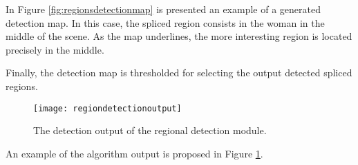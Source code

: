 In Figure \ref{fig:regionsdetectionmap} is presented an example of a generated detection map. In this case, the spliced region consists in the woman in the middle of the scene. As the map underlines, the more interesting region is located precisely in the middle.

Finally, the detection map is thresholded for selecting the output detected spliced regions.

\begin{figure}[h!]
  \centering
    \texttt{[image: regiondetectionoutput]}
    \caption{The detection output of the regional detection module.}\label{fig:regiondetectionoutput}
\end{figure}

An example of the algorithm output is proposed in Figure \ref{fig:regiondetectionoutput}.